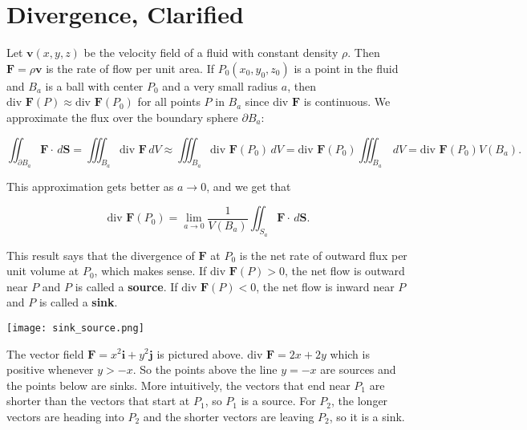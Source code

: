 \documentclass[11pt,oneside,english]{amsart}
\theoremstyle{definition}
\newcommand{\lom}[2]{\lim_{{#1}\rightarrow{#2}}}
\begin{document}
\section*{Divergence, Clarified}

Let $\mathbf{v}(x,y,z)$ be the velocity field of a fluid with constant density $\rho$. Then $\mathbf{F}=\rho \mathbf{v}$ is the rate of flow per unit area. If $P_0(x_0,y_0,z_0)$ is a point in the fluid and $B_a$ is a ball with center $P_0$ and a very small radius $a$, then $\text{div }\mathbf{F}(P)\approx\text{div }\mathbf{F}(P_0)$ for all points $P$ in $B_a$ since div $\mathbf{F}$ is continuous. We approximate the flux over the boundary sphere $\partial B_a$:

\[
\iint_{\partial B_a}\mathbf{F}\cdot\,d\mathbf{S}=\iiint_{B_a}\text{div }\mathbf{F}\,dV\approx\iiint_{B_a}\text{div }\mathbf{F}(P_0)\,dV=\text{div }\mathbf{F}(P_0)\iiint_{B_a}\,dV=\text{div }\mathbf{F}(P_0)V(B_a).
\]

This approximation gets better as $a\rightarrow0$, and we get that

\[
\text{div }\mathbf{F}(P_0)=\lom{a}{0}\frac{1}{V(B_a)}\iint_{S_a}\mathbf{F}\cdot\,d\mathbf{S}.
\]



This result says that the divergence of $\mathbf{F}$ at $P_0$ is the net rate of outward flux per unit volume at $P_0$, which makes sense. If $\text{div }\mathbf{F}(P)>0$, the net flow is outward near $P$ and $P$ is called a \textbf{source}. If $\text{div }\mathbf{F}(P)<0$, the net flow is inward near $P$ and $P$ is called a \textbf{sink}.

\begin{center}
\texttt{[image: sink\_source.png]}
\end{center}

The vector field $\mathbf{F}=x^2\mathbf{i}+y^2\mathbf{j}$ is pictured above. $\text{div }\mathbf{F}=2x+2y$ which is positive whenever $y>-x$. So the points above the line $y=-x$ are sources and the points below are sinks. More intuitively, the vectors that end near $P_1$ are shorter than the vectors that start at $P_1$, so $P_1$ is a source. For $P_2$, the longer vectors are heading into $P_2$ and the shorter vectors are leaving $P_2$, so it is a sink.
\end{document}
